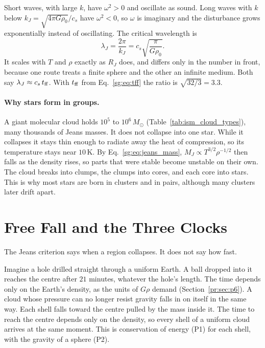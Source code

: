 Short waves, with large $k$, have $\omega^2>0$ and oscillate as sound. Long waves with $k$ below $k_J=\sqrt{4\pi G\rho_0}/c_s$ have $\omega^2<0$, so $\omega$ is imaginary and the disturbance grows exponentially instead of oscillating. The critical wavelength is
\begin{equation}
	\lambda_J=\frac{2\pi}{k_J}=c_s\sqrt{\frac{\pi}{G\rho_0}} .
	\label{sg:eq:jeans_wavelength}
\end{equation}
It scales with $T$ and $\rho$ exactly as $R_J$ does, and differs only in the number in front, because one route treats a finite sphere and the other an infinite medium. Both say $\lambda_J\approx c_s\,t_{\rm ff}$. With $t_{\rm ff}$ from Eq.~\eqref{sg:eq:tff} the ratio is $\sqrt{32/3}=3.3$.

\paragraph{Why stars form in groups.} A giant molecular cloud holds $10^5$ to $10^6\,M_\odot$ (Table~\ref{tab:ism_cloud_types}), many thousands of Jeans masses. It does not collapse into one star. While it collapses it stays thin enough to radiate away the heat of compression, so its temperature stays near $10\,\mathrm K$. By Eq.~\eqref{sg:eq:jeans_mass}, $M_J\propto T^{3/2}\rho^{-1/2}$ then falls as the density rises, so parts that were stable become unstable on their own. The cloud breaks into clumps, the clumps into cores, and each core into stars. This is why most stars are born in clusters and in pairs, although many clusters later drift apart.

\section{Free Fall and the Three Clocks}
\label{sg:sec:freefall}

The Jeans criterion says when a region collapses. It does not say how fast.

Imagine a hole drilled straight through a uniform Earth. A ball dropped into it reaches the centre after $21$ minutes, whatever the hole's length. The time depends only on the Earth's density, as the units of $G\rho$ demand (Section~\ref{pr:sec:p6}). A cloud whose pressure can no longer resist gravity falls in on itself in the same way. Each shell falls toward the centre pulled by the mass inside it. The time to reach the centre depends only on the density, so every shell of a uniform cloud arrives at the same moment. This is conservation of energy (P1) for each shell, with the gravity of a sphere (P2).

